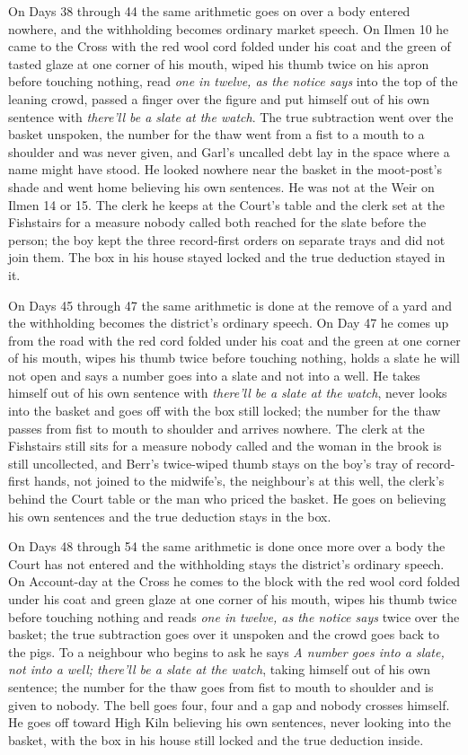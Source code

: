 \documentclass{design/chronicle}
\begin{document}
{On Days 38 through 44 the same arithmetic goes on over a body entered nowhere, and the withholding becomes ordinary market speech. On Ilmen 10 he came to the Cross with the red wool cord folded under his coat and the green of tasted glaze at one corner of his mouth, wiped his thumb twice on his apron before touching nothing, read \emph{one in twelve, as the notice says} into the top of the leaning crowd, passed a finger over the figure and put himself out of his own sentence with \emph{there’ll be a slate at the watch}. The true subtraction went over the basket unspoken, the number for the thaw went from a fist to a mouth to a shoulder and was never given, and Garl’s uncalled debt lay in the space where a name might have stood. He looked nowhere near the basket in the moot-post’s shade and went home believing his own sentences. He was not at the Weir on Ilmen 14 or 15. The clerk he keeps at the Court’s table and the clerk set at the Fishstairs for a measure nobody called both reached for the slate before the person; the boy kept the three record-first orders on separate trays and did not join them. The box in his house stayed locked and the true deduction stayed in it.

On Days 45 through 47 the same arithmetic is done at the remove of a yard and the withholding becomes the district’s ordinary speech. On Day 47 he comes up from the road with the red cord folded under his coat and the green at one corner of his mouth, wipes his thumb twice before touching nothing, holds a slate he will not open and says a number goes into a slate and not into a well. He takes himself out of his own sentence with \emph{there’ll be a slate at the watch}, never looks into the basket and goes off with the box still locked; the number for the thaw passes from fist to mouth to shoulder and arrives nowhere. The clerk at the Fishstairs still sits for a measure nobody called and the woman in the brook is still uncollected, and Berr’s twice-wiped thumb stays on the boy’s tray of record-first hands, not joined to the midwife’s, the neighbour’s at this well, the clerk’s behind the Court table or the man who priced the basket. He goes on believing his own sentences and the true deduction stays in the box.

On Days 48 through 54 the same arithmetic is done once more over a body the Court has not entered and the withholding stays the district’s ordinary speech. On Account-day at the Cross he comes to the block with the red wool cord folded under his coat and green glaze at one corner of his mouth, wipes his thumb twice before touching nothing and reads \emph{one in twelve, as the notice says} twice over the basket; the true subtraction goes over it unspoken and the crowd goes back to the pigs. To a neighbour who begins to ask he says \emph{A number goes into a slate, not into a well; there’ll be a slate at the watch}, taking himself out of his own sentence; the number for the thaw goes from fist to mouth to shoulder and is given to nobody. The bell goes four, four and a gap and nobody crosses himself. He goes off toward High Kiln believing his own sentences, never looking into the basket, with the box in his house still locked and the true deduction inside.

}
\end{document}
